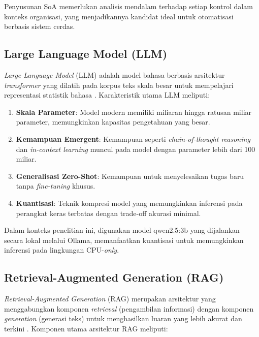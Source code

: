 \documentclass[bachelor,bahasa]{thesisdtetiugm}
\begin{document}
Penyusunan SoA memerlukan analisis mendalam terhadap setiap kontrol dalam konteks organisasi, yang menjadikannya kandidat ideal untuk otomatisasi berbasis sistem cerdas.

\subsection{Large Language Model (LLM)}

\textit{Large Language Model} (LLM) adalah model bahasa berbasis arsitektur \textit{transformer} yang dilatih pada korpus teks skala besar untuk mempelajari representasi statistik bahasa \cite{llmsurvey2023}. Karakteristik utama LLM meliputi:

\begin{enumerate}
	\item \textbf{Skala Parameter}: Model modern memiliki miliaran hingga ratusan miliar parameter, memungkinkan kapasitas pengetahuan yang besar.
	\item \textbf{Kemampuan Emergent}: Kemampuan seperti \textit{chain-of-thought reasoning} dan \textit{in-context learning} muncul pada model dengan parameter lebih dari 100 miliar.
	\item \textbf{Generalisasi Zero-Shot}: Kemampuan untuk menyelesaikan tugas baru tanpa \textit{fine-tuning} khusus.
	\item \textbf{Kuantisasi}: Teknik kompresi model yang memungkinkan inferensi pada perangkat keras terbatas dengan trade-off akurasi minimal.
\end{enumerate}

Dalam konteks penelitian ini, digunakan model qwen2.5:3b yang dijalankan secara lokal melalui Ollama, memanfaatkan kuantisasi untuk memungkinkan inferensi pada lingkungan CPU-\textit{only}.

\subsection{Retrieval-Augmented Generation (RAG)}

\textit{Retrieval-Augmented Generation} (RAG) merupakan arsitektur yang menggabungkan komponen \textit{retrieval} (pengambilan informasi) dengan komponen \textit{generation} (generasi teks) untuk menghasilkan luaran yang lebih akurat dan terkini \cite{ragoriginal, ragsurvey2024}. Komponen utama arsitektur RAG meliputi:
\end{document}
